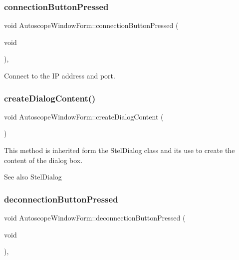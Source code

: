\subsubsection{\texorpdfstring{connectionButtonPressed}{connectionButtonPressed}}
{\footnotesize\ttfamily void Autoscope\+Window\+Form\+::connection\+Button\+Pressed (\begin{DoxyParamCaption}\item[{void}]{ }\end{DoxyParamCaption})\hspace{0.3cm}{\ttfamily [private]}, {\ttfamily [slot]}}



Connect to the IP address and port. 

\mbox{\label{class_autoscope_window_form_ab48246f0892a43963b7d209dc3bf4b4f}} 
\subsubsection{\texorpdfstring{createDialogContent()}{createDialogContent()}}
{\footnotesize\ttfamily void Autoscope\+Window\+Form\+::create\+Dialog\+Content (\begin{DoxyParamCaption}{ }\end{DoxyParamCaption})\hspace{0.3cm}{\ttfamily [protected]}}



This method is inherited form the Stel\+Dialog class and it\textquotesingle{}s use to create the content of the dialog box. 

\begin{DoxySeeAlso}{See also}
Stel\+Dialog 
\end{DoxySeeAlso}
\mbox{\label{class_autoscope_window_form_ab370615515fd07540aed9fa2afa06522}} 
\subsubsection{\texorpdfstring{deconnectionButtonPressed}{deconnectionButtonPressed}}
{\footnotesize\ttfamily void Autoscope\+Window\+Form\+::deconnection\+Button\+Pressed (\begin{DoxyParamCaption}\item[{void}]{ }\end{DoxyParamCaption})\hspace{0.3cm}{\ttfamily [private]}, {\ttfamily [slot]}}



